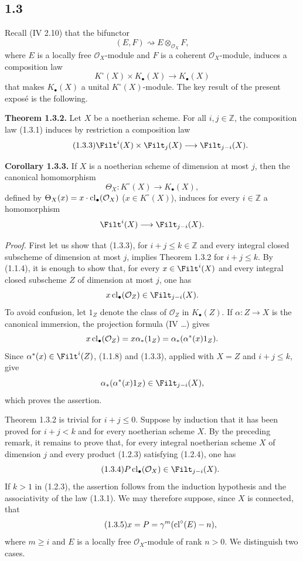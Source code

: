 \subsection*{1.3}
Recall (IV 2.10) that the bifunctor
\[
(E,F)\rightsquigarrow E\otimes_{\mathcal O_X}F,
\]
where $E$ is a locally free $\mathcal O_X$-module and $F$ is a coherent
$\mathcal O_X$-module, induces a composition law
\begin{equation}\tag{1.3.1}
K^\circ(X)\times K_\bullet(X)\longrightarrow K_\bullet(X)
\end{equation}
that makes $K_\bullet(X)$ a unital $K^\circ(X)$-module. The key result of the
present expos\'e is the following.

\textbf{Theorem 1.3.2.}
Let $X$ be a noetherian scheme. For all $i,j\in\mathbb Z$, the composition law
(1.3.1) induces by restriction a composition law
\begin{equation}\tag{1.3.3}
\Filt^i(X)\times\Filt_j(X)\longrightarrow\Filt_{j-i}(X).
\end{equation}

\textbf{Corollary 1.3.3.}
If $X$ is a noetherian scheme of dimension at most $j$, then the canonical
homomorphism
\[
\Theta_X:K^\circ(X)\longrightarrow K_\bullet(X),
\]
defined by $\Theta_X(x)=x\cdot\operatorname{cl}_\bullet(\mathcal O_X)$
($x\in K^\circ(X)$), induces for every $i\in\mathbb Z$ a homomorphism
\[
\Filt^i(X)\longrightarrow\Filt_{j-i}(X).
\]

\emph{Proof.}
First let us show that (1.3.3), for $i+j\leq k\in\mathbb Z$ and every integral
closed subscheme of dimension at most $j$, implies Theorem 1.3.2 for
$i+j\leq k$. By (1.1.4), it is enough to show that, for every
$x\in\Filt^i(X)$ and every integral closed subscheme $Z$ of dimension at most
$j$, one has
\[
x\cl_\bullet(\mathcal O_Z)\in\Filt_{j-i}(X).
\]
To avoid confusion, let $1_Z$ denote the class of $\mathcal O_Z$ in
$K_\bullet(Z)$. If $\alpha:Z\to X$ is the canonical immersion, the projection
formula (IV \ldots) gives
\[
x\operatorname{cl}_\bullet(\mathcal O_Z)
=x\alpha_*(1_Z)
=\alpha_*(\alpha^*(x)1_Z).
\]
Since $\alpha^*(x)\in\Filt^i(Z)$, (1.1.8) and (1.3.3), applied with $X=Z$
and $i+j\leq k$, give
\[
\alpha_*(\alpha^*(x)1_Z)\in\Filt_{j-i}(X),
\]
which proves the assertion.

Theorem 1.3.2 is trivial for $i+j\leq0$. Suppose by induction that it has been
proved for $i+j<k$ and for every noetherian scheme $X$. By the preceding
remark, it remains to prove that, for every integral noetherian scheme $X$ of
dimension $j$ and every product (1.2.3) satisfying (1.2.4), one has
\begin{equation}\tag{1.3.4}
P\cl_\bullet(\mathcal O_X)\in\Filt_{j-i}(X).
\end{equation}
If $k>1$ in (1.2.3), the assertion follows from the induction hypothesis and
the associativity of the law (1.3.1). We may therefore suppose, since $X$ is
connected, that
\begin{equation}\tag{1.3.5}
x=P=\gamma^m(\operatorname{cl}^\circ(E)-n),
\end{equation}
where $m\geq i$ and $E$ is a locally free $\mathcal O_X$-module of rank
$n>0$. We distinguish two cases.

